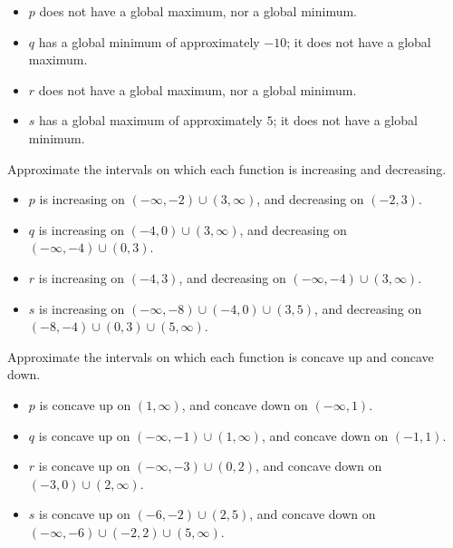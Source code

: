 \begin{exercises}
\begin{problem}
\begin{subproblem}
\begin{shortsolution}
		\begin{itemize}
			\item $p$ does not have a global maximum, nor a global minimum.
			\item $q$ has a global minimum of approximately $-10$; it does not have a global maximum.
			\item $r$ does not have a global maximum, nor a global minimum.
			\item $s$ has a global maximum of approximately $5$; it does not have a global minimum.
		\end{itemize}
	\end{shortsolution}
\end{subproblem}
\begin{subproblem}
	Approximate the intervals on which each function is increasing and decreasing.
	\begin{shortsolution}
		\begin{itemize}
			\item $p$ is increasing on $(-\infty,-2)\cup (3,\infty)$, and decreasing on $(-2,3)$.
			\item $q$ is increasing on $(-4,0)\cup (3,\infty)$, and decreasing on $(-\infty,-4)\cup (0,3)$.
			\item $r$ is increasing on $(-4,3)$, and decreasing on $(-\infty,-4)\cup (3,\infty)$.
			\item $s$ is increasing on $(-\infty,-8)\cup (-4,0)\cup (3,5)$, and decreasing on $(-8,-4)\cup (0,3)\cup (5,\infty)$.
		\end{itemize}
	\end{shortsolution}
\end{subproblem}
\begin{subproblem}
	Approximate the intervals on which each function is concave up and concave down.
	\begin{shortsolution}
		\begin{itemize}
			\item $p$ is concave up on  $(1,\infty)$, and concave down on  $(-\infty,1)$.
			\item $q$ is concave up on $(-\infty,-1)\cup (1,\infty)$, and concave down on $(-1,1)$.
			\item $r$ is concave up on $(-\infty,-3)\cup (0,2)$, and concave down on $(-3,0)\cup (2,\infty)$.
			\item $s$ is concave up on $(-6,-2)\cup (2,5)$, and concave down on $(-\infty,-6)\cup (-2,2)\cup (5,\infty)$.
		\end{itemize}
	\end{shortsolution}

\end{subproblem}
\end{problem}
\end{exercises}

